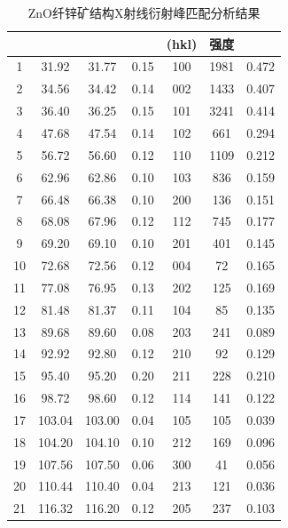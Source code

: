 \documentclass[10pt, a4paper]{article}
\begin{document}
\twocolumn  %
	\begin{table}[htbp]
		\centering
		\caption{ZnO纤锌矿结构X射线衍射峰匹配分析结果}
		\label{tab:zno-xrd-peaks}
		\small
		\begin{tabular}{
				S[table-format=2.0]
				S[table-format=3.2]
				S[table-format=3.2]
				S[table-format=1.2]
				c
				S[table-format=4.0]
				S[table-format=1.3]
			}
			\toprule
			{} & 
			{} & 
			{} & 
			{\makecell{$\Delta 2\theta$\\ (\si{\degree})}} & 
			{(hkl)} & 
			{强度} & 
			{} \\
			  & 31.92 & 31.77 & 0.15 & 100 & 1981 & 0.472 \\
			2  & 34.56 & 34.42 & 0.14 & 002 & 1433 & 0.407 \\
			3  & 36.40 & 36.25 & 0.15 & 101 & 3241 & 0.414 \\
			4  & 47.68 & 47.54 & 0.14 & 102 &  661 & 0.294 \\
			5  & 56.72 & 56.60 & 0.12 & 110 & 1109 & 0.212 \\
			6  & 62.96 & 62.86 & 0.10 & 103 &  836 & 0.159 \\
			7  & 66.48 & 66.38 & 0.10 & 200 &  136 & 0.151 \\
			8  & 68.08 & 67.96 & 0.12 & 112 &  745 & 0.177 \\
			9  & 69.20 & 69.10 & 0.10 & 201 &  401 & 0.145 \\
			10 & 72.68 & 72.56 & 0.12 & 004 &   72 & 0.165 \\
			11 & 77.08 & 76.95 & 0.13 & 202 &  125 & 0.169 \\
			12 & 81.48 & 81.37 & 0.11 & 104 &   85 & 0.135 \\
			13 & 89.68 & 89.60 & 0.08 & 203 &  241 & 0.089 \\
			14 & 92.92 & 92.80 & 0.12 & 210 &   92 & 0.129 \\
			15 & 95.40 & 95.20 & 0.20 & 211 &  228 & 0.210 \\
			16 & 98.72 & 98.60 & 0.12 & 114 &  141 & 0.122 \\
			17 & 103.04 & 103.00 & 0.04 & 105 &  105 & 0.039 \\
			18 & 104.20 & 104.10 & 0.10 & 212 &  169 & 0.096 \\
			19 & 107.56 & 107.50 & 0.06 & 300 &   41 & 0.056 \\
			20 & 110.44 & 110.40 & 0.04 & 213 &  121 & 0.036 \\
			21 & 116.32 & 116.20 & 0.12 & 205 &  237 & 0.103 \\
			\bottomrule
		\end{tabular}
	\end{table}
\end{document}
